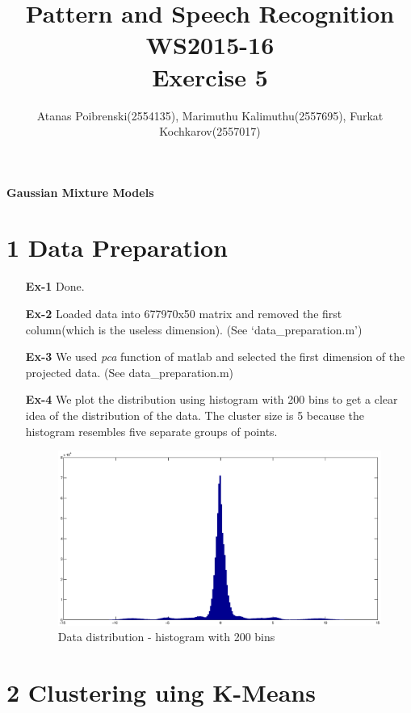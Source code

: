 \documentclass[a4paper]{article}
\title{Pattern and Speech Recognition WS2015-16 \\ Exercise 5}
\author{Atanas Poibrenski(2554135), Marimuthu Kalimuthu(2557695), Furkat Kochkarov(2557017)}
\begin{document}
\maketitle 
\begin{center}
	\textbf{Gaussian Mixture Models} 
\end{center}

\section*{1 Data Preparation}

\begin{enumerate}
	\item[ \textbf{Ex-1} ] Done.
	\item[ \textbf{Ex-2} ] Loaded data into 677970x50 matrix and removed the first column(which is the useless dimension). (See `data\_preparation.m')
	\item[ \textbf{Ex-3} ] We used \textit{pca} function of matlab and selected the first dimension of the projected data. (See data\_preparation.m)
	\item[ \textbf{Ex-4} ] We plot the distribution using histogram with 200 bins to get a clear idea of the distribution of the data. The cluster size is 5 because the histogram resembles five separate groups of points.

	\begin{figure}[H]
		\begin{center}
			\includegraphics[width=1.2\textwidth]{hist.eps}
			\caption{Data distribution - histogram with 200 bins}\label{fig:histdist}
		\end{center}
	\end{figure}

\end{enumerate}


\section*{2 Clustering uing K-Means}
\end{document}
